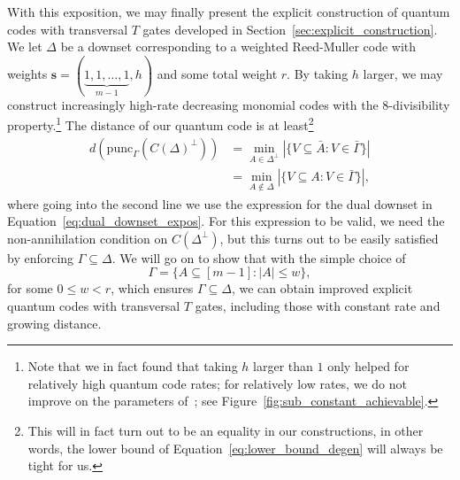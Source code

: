 \documentclass{article}
\begin{document}
With this exposition, we may finally present the explicit construction of quantum codes with transversal $T$ gates developed in Section~\ref{sec:explicit_construction}. We let $\Delta$ be a downset corresponding to a weighted Reed-Muller code with weights $\boldsymbol{s} = (\underbrace{1, 1, \ldots, 1}_{m-1}, h)$ and some total weight $r$. By taking $h$ larger, we may construct increasingly high-rate decreasing monomial codes with the $8$-divisibility property.\footnote{Note that we in fact found that taking $h$ larger than $1$ only helped for relatively high quantum code rates; for relatively low rates, we do not improve on the parameters of~\cite{hastings2018distillation,haah2018towers}; see Figure~\ref{fig:sub_constant_achievable}.} The distance of our quantum code is at least\footnote{This will in fact turn out to be an equality in our constructions, in other words, the lower bound of Equation~\eqref{eq:lower_bound_degen} will always be tight for us.}
\begin{align}
    d\left(\text{punc}_\Gamma(C(\Delta)^\perp)\right) &= \min_{A \in \Delta^\perp}\left|\{V \subseteq \bar{A}: V \in \bar{\Gamma}\}\right|\\
    &=\min_{A \notin \Delta}\left|\{V \subseteq A: V \in \bar{\Gamma}\}\right|,\label{eq:quantum_distance_before_rewrite}
\end{align}
where going into the second line we use the expression for the dual downset in Equation~\eqref{eq:dual_downset_expos}. For this expression to be valid, we need the non-annihilation condition on $C(\Delta^\perp)$, but this turns out to be easily satisfied by enforcing $\Gamma \subseteq \Delta$. We will go on to show that with the simple choice of
\begin{equation}\label{eq:starting_gamma_form}
    \Gamma = \{A \subseteq [m-1]: |A| \leq w\},
\end{equation}
for some $0 \leq w < r$, which ensures $\Gamma \subseteq \Delta$, we can obtain improved explicit quantum codes with transversal $T$ gates, including those with constant rate and growing distance.
\end{document}
